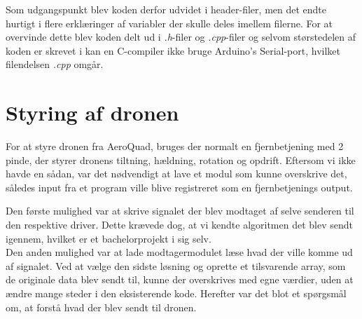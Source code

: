 \documentclass[Main]{subfiles}
\begin{document}
Som udgangspunkt blev koden derfor udvidet i header-filer, men det endte hurtigt i flere erklæringer af variabler der skulle deles imellem filerne. 
For at overvinde dette blev koden delt ud i \textit{.h}-filer og \textit{.cpp}-filer og selvom størstedelen af koden er skrevet i  kan en C-compiler ikke bruge Arduino's Serial-port, hvilket filendelsen \textit{.cpp} omgår.



\section{Styring af dronen}
For at styre dronen fra AeroQuad, bruges der normalt en fjernbetjening med 2 pinde, der styrer dronens tiltning, hældning, rotation og opdrift.
Eftersom vi ikke havde en sådan, var det nødvendigt at lave et modul som kunne overskrive det, således input fra et program ville blive registreret som en fjernbetjenings output.


Den første mulighed var at skrive signalet der blev modtaget af selve senderen til den respektive driver. 
Dette krævede dog, at vi kendte algoritmen det blev sendt igennem, hvilket er et bachelorprojekt i sig selv.
\\
Den anden mulighed var at lade modtagermodulet læse hvad der ville komme ud af signalet.
Ved at vælge den sidste løsning og oprette et tilsvarende array, som de originale data blev sendt til, kunne der overskrives med egne værdier, uden at ændre mange steder i den eksisterende kode.
Herefter var det blot et spørgsmål om, at forstå hvad der blev sendt til dronen.
\end{document}
